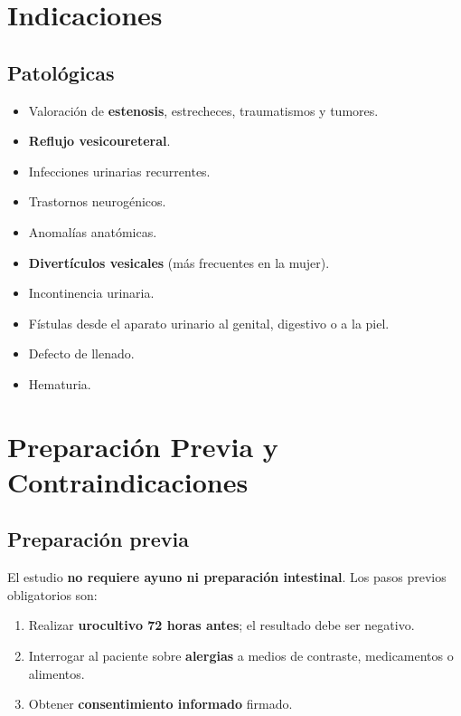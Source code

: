 \section*{Indicaciones}

\subsection*{Patológicas}

\begin{itemize}[noitemsep]
  \item Valoración de \textbf{estenosis}, estrecheces, traumatismos y tumores.
  \item \textbf{Reflujo vesicoureteral}.
  \item Infecciones urinarias recurrentes.
  \item Trastornos neurogénicos.
  \item Anomalías anatómicas.
  \item \textbf{Divertículos vesicales} (más frecuentes en la mujer).
  \item Incontinencia urinaria.
  \item Fístulas desde el aparato urinario al genital, digestivo o a la piel.
  \item Defecto de llenado.
  \item Hematuria.
\end{itemize}

\section*{Preparación Previa y Contraindicaciones}

\subsection*{Preparación previa}

El estudio \textbf{no requiere ayuno ni preparación intestinal}. Los pasos previos obligatorios son:

\begin{enumerate}[noitemsep]
  \item Realizar \textbf{urocultivo 72 horas antes}; el resultado debe ser negativo.
  \item Interrogar al paciente sobre \textbf{alergias} a medios de contraste, medicamentos o alimentos.
  \item Obtener \textbf{consentimiento informado} firmado.
\end{enumerate}

